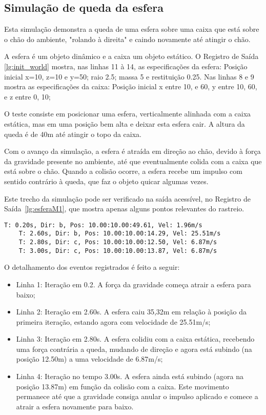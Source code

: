 \documentclass[12pt]{article}
\begin{document}
\subsection{Simulação de queda da esfera }

Esta simulação demonstra a queda de uma esfera sobre uma caixa que está sobre o chão do ambiente, "rolando à direita" e caindo novamente até atingir o chão. 

A esfera é um objeto dinâmico e a caixa um objeto estático. O Registro de Saída \ref{lg:init_world} mostra, nas linhas 11 à 14, as especificações da esfera: Posição inicial x=10, z=10 e y=50; raio 2.5; massa 5 e restituição 0.25. Nas linhas 8 e 9 mostra as especificações da caixa: Posição inicial x entre 10, e 60, y entre 10, 60, e z entre 0, 10;

O teste consiste em posicionar uma esfera, verticalmente alinhada com a caixa estática, mas em uma posição bem alta e deixar esta esfera cair. A altura da queda é de 40m até atingir o topo da caixa.

Com o avanço da simulação, a esfera é atraída em direção ao chão, devido à força da gravidade presente no ambiente, até que eventualmente colida com a caixa  que está sobre o chão. Quando a colisão ocorre, a esfera recebe um impulso com sentido contrário à queda, que faz o objeto quicar algumas vezes. 

Este trecho da simulação pode ser verificado na saída acessível, no Registro de Saída~\ref{lg:esferaM1}, que mostra apenas alguns pontos relevantes do rastreio.

\begin{lstlisting}[frame=single,caption=Queda da esfera. \label{lg:esferaM1}]
	T: 0.20s, Dir: b, Pos: 10.00:10.00:49.61, Vel: 1.96m/s
	T: 2.60s, Dir: b, Pos: 10.00:10.00:14.29, Vel: 25.51m/s
	T: 2.80s, Dir: c, Pos: 10.00:10.00:12.50, Vel: 6.87m/s
	T: 3.00s, Dir: c, Pos: 10.00:10.00:13.87, Vel: 6.87m/s
\end{lstlisting}

O detalhamento dos eventos registrados é feito a seguir:
\begin{itemize}
	\item Linha 1: Iteração em 0.2. A força da gravidade começa atrair a esfera para baixo;
	\item Linha 2: Iteração em 2.60s. A esfera caiu 35,32m em relação à posição da primeira iteração, estando agora com velocidade de 25.51m/s;
	\item Linha 3: Iteração em 2.80s. A esfera colidiu com a caixa estática, recebendo uma força contrária a queda, mudando de direção e agora está subindo (na posição 12.50m) a uma velocidade de 6.87m/s; 
	\item Linha 4: Iteração no tempo 3.00s. A esfera ainda está subindo (agora na posição 13.87m) em função da colisão com a caixa. Este movimento permanece até que a gravidade consiga anular o impulso aplicado e comece a atrair a esfera novamente para baixo.
\end{itemize}
\end{document}

